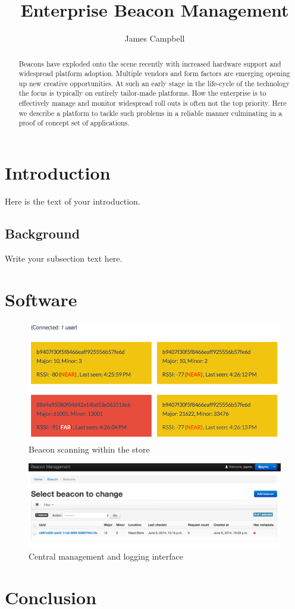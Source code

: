 \documentclass{article}
\begin{document}
\title{Enterprise Beacon Management}
\author{James Campbell}

\maketitle

\begin{abstract}
Beacons have exploded onto the scene recently with increased hardware support and widespread platform adoption. Multiple vendors and form factors are emerging opening up new creative opportunities. At such an early stage in the life-cycle of the technology the focus is typically on entirely tailor-made platforms. How the enterprise is to effectively manage and monitor widespread roll outs is often not the top priority. Here we describe a platform to tackle such problems in a reliable manner culminating in a proof of concept set of applications.
\end{abstract}

\section{Introduction}
Here is the text of your introduction.

\subsection{Background}
Write your subsection text here.

\section{Software}

\begin{figure}
    \centering
    \includegraphics[width=\textwidth]{images/scanning.png}
    \caption{Beacon scanning within the store}
    \label{simulationfigure}
\end{figure}

\begin{figure}
    \centering
    \includegraphics[width=\textwidth]{images/management.png}
    \caption{Central management and logging interface}
    \label{simulationfigure}
\end{figure}

\section{Conclusion}
\end{document}
